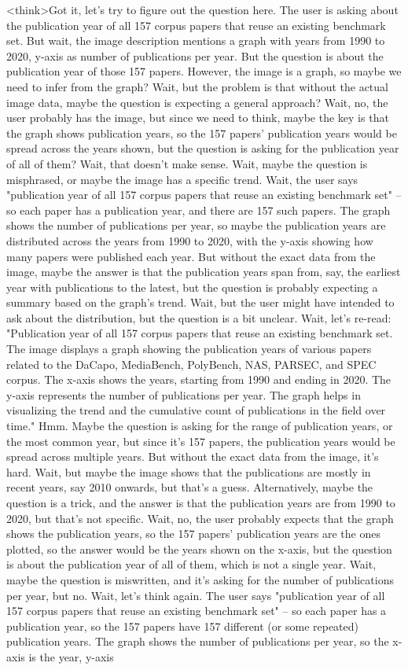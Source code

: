 <think>Got it, let's try to figure out the question here. The user is asking about the publication year of all 157 corpus papers that reuse an existing benchmark set. But wait, the image description mentions a graph with years from 1990 to 2020, y-axis as number of publications per year. But the question is about the publication year of those 157 papers. However, the image is a graph, so maybe we need to infer from the graph? Wait, but the problem is that without the actual image data, maybe the question is expecting a general approach? Wait, no, the user probably has the image, but since we need to think, maybe the key is that the graph shows publication years, so the 157 papers' publication years would be spread across the years shown, but the question is asking for the publication year of all of them? Wait, that doesn't make sense. Wait, maybe the question is misphrased, or maybe the image has a specific trend. Wait, the user says "publication year of all 157 corpus papers that reuse an existing benchmark set" – so each paper has a publication year, and there are 157 such papers. The graph shows the number of publications per year, so maybe the publication years are distributed across the years from 1990 to 2020, with the y-axis showing how many papers were published each year. But without the exact data from the image, maybe the answer is that the publication years span from, say, the earliest year with publications to the latest, but the question is probably expecting a summary based on the graph's trend. Wait, but the user might have intended to ask about the distribution, but the question is a bit unclear. Wait, let's re-read: "Publication year of all 157 corpus papers that reuse an existing benchmark set. The image displays a graph showing the publication years of various papers related to the DaCapo, MediaBench, PolyBench, NAS, PARSEC, and SPEC corpus. The x-axis shows the years, starting from 1990 and ending in 2020. The y-axis represents the number of publications per year. The graph helps in visualizing the trend and the cumulative count of publications in the field over time." Hmm. Maybe the question is asking for the range of publication years, or the most common year, but since it's 157 papers, the publication years would be spread across multiple years. But without the exact data from the image, it's hard. Wait, but maybe the image shows that the publications are mostly in recent years, say 2010 onwards, but that's a guess. Alternatively, maybe the question is a trick, and the answer is that the publication years are from 1990 to 2020, but that's not specific. Wait, no, the user probably expects that the graph shows the publication years, so the 157 papers' publication years are the ones plotted, so the answer would be the years shown on the x-axis, but the question is about the publication year of all of them, which is not a single year. Wait, maybe the question is miswritten, and it's asking for the number of publications per year, but no. Wait, let's think again. The user says "publication year of all 157 corpus papers that reuse an existing benchmark set" – so each paper has a publication year, so the 157 papers have 157 different (or some repeated) publication years. The graph shows the number of publications per year, so the x-axis is the year, y-axis 